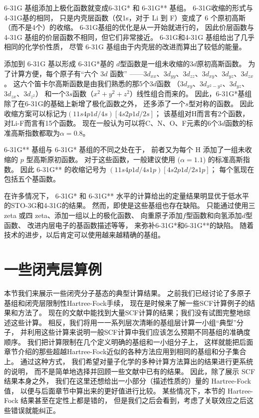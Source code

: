 6-31G 基组添加上极化函数就变成6-31G* 和 6-31G** 基组。 
6-31G收缩的形式与4-31G基的相同，
只是内壳层函数（仅1s，对于 Li 到 F）变成了 6 个原初高斯（而不是4个）的收缩。 
6-31G基组的优化是从一开始就进行的，
因此价层函数与 4-31G 基组的价层函数不相同，但它们非常接近。 
6-31G和4-31G 基组给出了几乎相同的化学价性质，
尽管 6-31G 基组由于内壳层的改进而算出了较低的能量。

添加到 6-31G 基以形成 6-31G*基的 $d$型函数是一组未收缩的$3d$原初高斯函数。 
为了计算方便，每个原子有“六个 $3d$ 函数”
——$3d_{xx}$、$3d_{yy}$、$3d_{zz}$、$3d_{xy}$、$3d_{yz}$、$3d_{zx}$。
这六个笛卡尔高斯函数是由我们熟悉的那5个$3d$函数
（$3d_{xy}$、$3d_{x^2-y^2}$、$3d_{yz}$、$3d_{zx}$、$3d_{z^2}$）
和一个$3s$函数（$x^2+y^2+z^2$）线性组合而来的。
因此，6-31G*基组除了在6-31G的基础上新增了极化函数之外，
还多添了一个$s$型对称的函数。
因此收缩方案可以标记为$(11s4p1d/4s)[4s2p1d/2s]$；
该基组对H而言有2个函数，对Li-F而言有15个函数。
现在一般认为可以将C、N、O、F元素的6个$3d$函数的标准高斯指数都取为$\alpha=0.8$。

6-31G** 基组与 6-31G* 基组的不同之处在于，
前者又为每个 H 添加了一组未收缩的 $p$ 型高斯原初函数。
对于这些函数，一般建议使用 ($\alpha = 1.1$) 的标准高斯指数。
因此 6-31G** 的收缩记号为 $(11s4p1d/4s1p)[4s2p1d/2s1p]$；
每个氢现在包括五个基函数。


在许多情况下，
6-31G* 和 6-31G** 水平的计算给出的定量结果明显优于低水平的STO-3G和4-31G的结果。 
然而，即使是这些基组也存在缺陷。
只能通过使用三 zeta 或四 zeta、添加一组以上的极化函数、
向重原子添加$f$型函数和向氢添加$d$型函数、
改进内层电子的基函数描述等等，
来弥补6-31G*和6-31G**的缺陷。
随着技术的进步，以后肯定可以使用越来越精确的基组。


\section{一些闭壳层算例}
本节我们来展示一些闭壳分子基态的典型\hft 计算结果。
之前我们已经讨论了多原子基组和闭壳层限制性Hartree-Fock手续，
现在是时候来了解一些SCF计算例子的结果和方法了。
现在的文献中能找到大量SCF计算的结果；我们没有试图完整地综述这些计算。
相反，我们将用一一系列层次清晰的基组层计算一小组“典型”分子，
并利用这些计算来说明一般SCF计算中我们应该怎么预期不同基组的准确度顺序。
我们把计算限制在几个定义明确的基组和一小组分子上，
这样就能把后面章节介绍的那些超越Hartree-Fock近似的各种方法应用到相同的基组和分子集合上。
通过这种方式，
我们希望对量子化学的多种计算方法算出的结果进行更系统的说明，
而不是简单地选择并回顾一些文献中已有的结果。
因此，除了展示 SCF 结果本身之外，
我们在这里还想给出一小部分（描述性质的）量的 Hartree-Fock 值，
以便与后面章节中算出来的更好值进行比较。
某些情况下，本节的 Hartree-Fock 结果甚至在定性上都是错的，
但是我们之后会看到，考虑了关联效应之后这些错误就能纠正。

